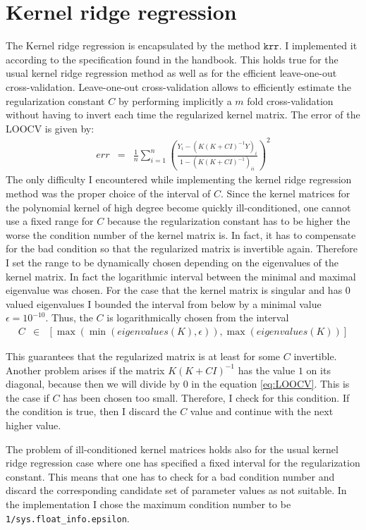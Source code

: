 \documentclass[a4paper, 11pt, titlepage]{article}
\begin{document}
\section{Kernel ridge regression}

The Kernel ridge regression is encapsulated by the method $\texttt{krr}$.
I implemented it according to the specification found in the handbook.
This holds true for the usual kernel ridge regression method as well as for the efficient leave-one-out cross-validation.
Leave-one-out cross-validation allows to efficiently estimate the regularization constant $C$ by performing implicitly a $m$ fold cross-validation without having to invert each time the regularized kernel matrix.
The error of the LOOCV is given by:
\begin{eqnarray}
	err &=& \frac{1}{n}\sum_{i=1}^n\left(\frac{Y_i - (K(K+CI)^{-1}Y)_i}{1-(K(K+CI)^{-1})_{ii}} \right)^2 \label{eq:LOOCV}
\end{eqnarray}
The only difficulty I encountered while implementing the kernel ridge regression method was the proper choice of the interval of $C$.
Since the kernel matrices for the polynomial kernel of high degree become quickly ill-conditioned, one cannot use a fixed range for $C$ because the regularization constant has to be higher the worse the condition number of the kernel matrix is.
In fact, it has to compensate for the bad condition so that the regularized matrix is invertible again.
Therefore I set the range to be dynamically chosen depending on the eigenvalues of the kernel matrix.
In fact the logarithmic interval between the minimal and maximal eigenvalue was chosen.
For the case that the kernel matrix is singular and has $0$ valued eigenvalues I bounded the interval from below by a minimal value $\epsilon=10^{-10}$.
Thus, the $C$ is logarithmically chosen from the interval
\begin{eqnarray*}
	C &\in& [\max(\min(eigenvalues(K),\epsilon)), \max(eigenvalues(K)) ]
\end{eqnarray*}

This guarantees that the regularized matrix is at least for some $C$ invertible.
Another problem arises if the matrix $K(K+CI)^{-1}$ has the value $1$ on its diagonal, because then we will divide by $0$ in the equation \eqref{eq:LOOCV}.
This is the case if $C$ has been chosen too small.
Therefore, I check for this condition.
If the condition is true, then I discard the $C$ value and continue with the next higher value.

The problem of ill-conditioned kernel matrices holds also for the usual kernel ridge regression case where one has specified a fixed interval for the regularization constant.
This means that one has to check for a bad condition number and discard the corresponding candidate set of parameter values as not suitable.
In the implementation I chose the maximum condition number to be \texttt{1/sys.float\_info.epsilon}.
\end{document}
